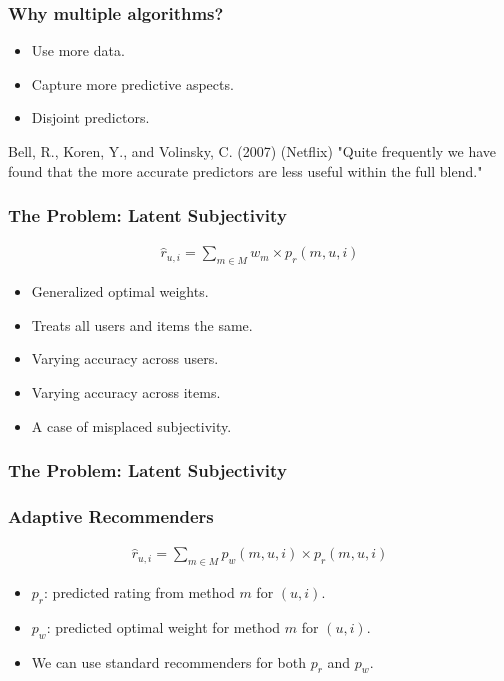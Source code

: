 \documentclass[screen]{beamer}
\begin{document}
\begin{frame}
  \frametitle{Why multiple algorithms?}
  \begin{itemize}
    \item Use more data.
    \item Capture more predictive aspects.
    \item Disjoint predictors.
  \end{itemize}
  
  \begin{block}{Bell, R., Koren, Y., and Volinsky, C. (2007) (Netflix)}
    "Quite frequently we have found that the more accurate predictors are less useful within the full blend."
  \end{block}
\end{frame}

\begin{frame}
  \frametitle{The Problem: Latent Subjectivity}
  \begin{eqnarray}
    \hat{r}_{u,i} = \sum_{m \in M} w_{m} \times p_{r}(m,u,i)
  \end{eqnarray}
  \begin{itemize}
    \item Generalized optimal weights.
    \item Treats all users and items the same.
    \item Varying accuracy across users.
    \item Varying accuracy across items.
    \item A case of misplaced subjectivity.
  \end{itemize}
\end{frame}

\begin{frame}
  \frametitle{The Problem: Latent Subjectivity}
  \huge
  \linespread{2}{
    Systems that insist on being adaptive in a certain way
    are not really adaptive at all.  
  }
\end{frame}

\begin{frame}
  \frametitle{Adaptive Recommenders}
  \begin{eqnarray}
    \hat{r}_{u,i} = \sum_{m \in M} p_{w}(m,u,i) \times p_{r}(m,u,i)
  \end{eqnarray}
  \begin{itemize}
    \item $p_r$: predicted rating from method $m$ for $(u,i)$.
    \item $p_w$: predicted optimal weight for method $m$ for $(u,i)$.
    \item We can use standard recommenders for both $p_r$ and $p_w$.
  \end{itemize}
\end{frame}
\end{document}
